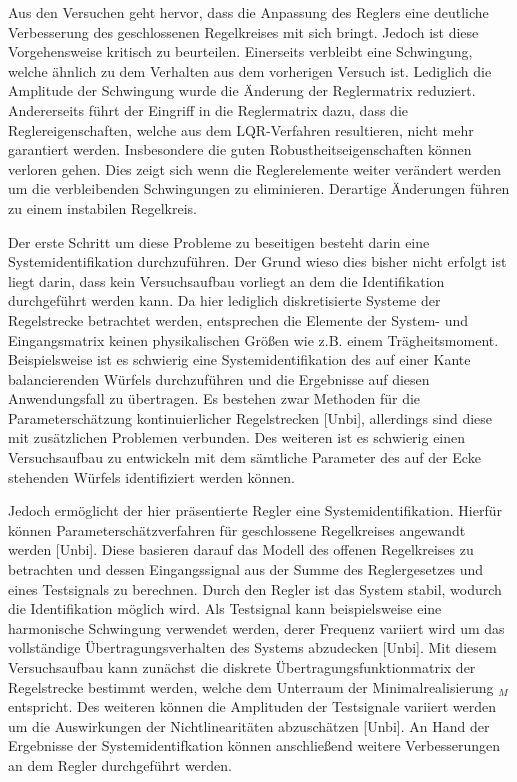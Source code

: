 Aus den Versuchen geht hervor, dass die Anpassung des Reglers eine deutliche Verbesserung des geschlossenen Regelkreises mit sich bringt. Jedoch ist diese Vorgehensweise kritisch zu beurteilen. Einerseits verbleibt eine Schwingung, welche ähnlich zu dem Verhalten aus dem vorherigen Versuch ist. Lediglich die Amplitude der Schwingung wurde die Änderung der Reglermatrix reduziert. Andererseits führt der Eingriff in die Reglermatrix dazu, dass die Reglereigenschaften, welche aus dem LQR-Verfahren resultieren, nicht mehr garantiert werden. Insbesondere die guten Robustheitseigenschaften können verloren gehen. Dies zeigt sich wenn die Reglerelemente weiter verändert werden um die verbleibenden Schwingungen zu eliminieren. Derartige Änderungen führen zu einem instabilen Regelkreis.

Der erste Schritt um diese Probleme zu beseitigen besteht darin eine Systemidentifikation durchzuführen. Der Grund wieso dies bisher nicht erfolgt ist liegt darin, dass kein Versuchsaufbau vorliegt an dem die Identifikation durchgeführt werden kann. Da hier lediglich diskretisierte Systeme der Regelstrecke betrachtet werden, entsprechen die Elemente der System- und Eingangsmatrix keinen physikalischen Größen wie z.B. einem Trägheitsmoment. Beispielsweise ist es schwierig eine Systemidentifikation des auf einer Kante balancierenden Würfels durchzuführen und die Ergebnisse auf diesen Anwendungsfall zu übertragen. Es bestehen zwar Methoden für die Parameterschätzung kontinuierlicher Regelstrecken [Unbi], allerdings sind diese mit zusätzlichen Problemen verbunden. Des weiteren ist es schwierig einen Versuchsaufbau zu entwickeln mit dem sämtliche Parameter des auf der Ecke stehenden Würfels identifiziert werden können.

Jedoch ermöglicht der hier präsentierte Regler eine Systemidentifikation. Hierfür können Parameterschätzverfahren für geschlossene Regelkreises angewandt werden [Unbi]. Diese basieren darauf das Modell des offenen Regelkreises zu betrachten und dessen Eingangssignal aus der Summe des Reglergesetzes und eines Testsignals zu berechnen. Durch den Regler ist das System stabil, wodurch die Identifikation möglich wird. Als Testsignal kann beispielsweise eine harmonische Schwingung verwendet werden, derer Frequenz variiert wird um das vollständige Übertragungsverhalten des Systems abzudecken [Unbi]. Mit diesem Versuchsaufbau kann zunächst die diskrete Übertragungsfunktionmatrix der Regelstrecke bestimmt werden, welche dem Unterraum der Minimalrealisierung $_M$ entspricht. Des weiteren können die Amplituden der Testsignale variiert werden um die Auswirkungen der Nichtlinearitäten abzuschätzen [Unbi]. An Hand der Ergebnisse der Systemidentifkation können anschließend weitere Verbesserungen an dem Regler durchgeführt werden.